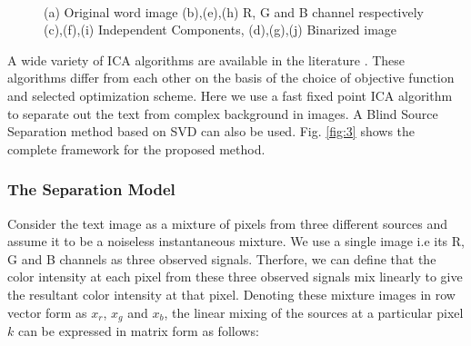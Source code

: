 \begin{figure}[t]
{}\\
\hspace*{1.5in}
\caption
{(a) Original word image (b),(e),(h) R, G and B channel respectively
(c),(f),(i) Independent Components, (d),(g),(j) Binarized image}
\label{fig:4}
\end{figure}

A wide variety of ICA algorithms are available in the literature \cite{A11,A12}. These algorithms differ from each other on the
basis of the choice of objective function and selected optimization scheme. Here we use a fast fixed point
ICA algorithm to separate out the text from complex background in images. A Blind Source 
Separation method based on SVD \cite{A10} can also be used. Fig. \ref{fig:3} 
shows the complete framework for the proposed method.

\subsubsection{The Separation Model}

Consider the text image as a mixture of pixels from three different sources
and assume it to be a noiseless instantaneous mixture.
We use a single image i.e its R, G and B channels as three observed signals.
Therfore, we can define that the color intensity at each pixel from these three observed signals
mix linearly to give the resultant color intensity at that pixel.
Denoting these mixture images in row vector form
as $x_r$, $x_g$ and $x_b$, the linear mixing of the sources at a particular pixel $k$ can be
expressed in matrix form as follows:

